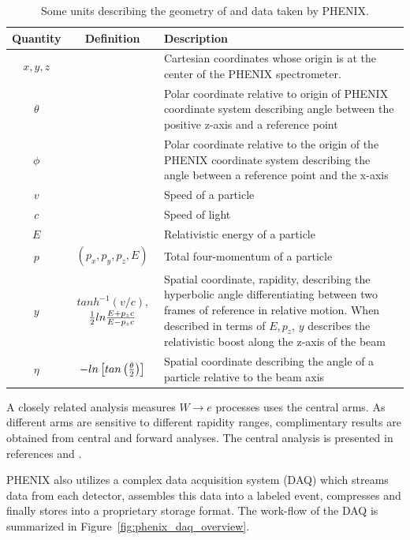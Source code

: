 \begin{table}[ht] 
  \centering
  \begin{tabular}{ c c p{8cm} }
    \toprule
    \textbf{Quantity} & \textbf{Definition} &  \textbf{Description} \\
    \midrule
    $x,y,z$ & & Cartesian coordinates whose origin is at the center of the PHENIX spectrometer. \\
    $\theta$ & & Polar coordinate relative to origin of PHENIX coordinate system describing angle between the positive z-axis and a reference point \\ 
    $\phi$ & & Polar coordinate relative to the origin of the PHENIX coordinate system describing the angle between a reference point and the x-axis \\
    $v$ & & Speed of a particle \\
    $c$ & & Speed of light \\
    $E$ & & Relativistic energy of a particle \\
    $p$ & $\left(p_x,p_y,p_z,E\right)$ & Total four-momentum of a particle \\
    $y$ & $tanh^{-1}(v/c)$, ${1\over2}{ln{{E+p_zc}\over{E-p_zc}}}$ & Spatial coordinate, rapidity, describing the hyperbolic angle differentiating between two frames of reference in relative motion. When described in terms of $E,p_z$, $y$ describes the relativistic boost along the z-axis of the beam\\ 
    $\eta$ & $-ln\left[tan\left({\theta\over2}\right)\right]$ & Spatial coordinate describing the angle of a particle relative to the beam axis \\
    \bottomrule
  \end{tabular}
  \caption{
    Some units describing the geometry of and data taken by PHENIX.
  }
  \label{tab:units}
\end{table}

A closely related analysis measures $W\rightarrow e$ processes uses the central
arms. As different arms are sensitive to different rapidity ranges,
complimentary results are obtained from central and forward analyses. The
central analysis is presented in references \cite{Gal2014b} and
\cite{Adare2015a}. 

PHENIX also utilizes a complex data acquisition system (DAQ) which streams data
from each detector, assembles this data into a labeled event, compresses and
finally stores into a proprietary storage format. The work-flow of the DAQ is
summarized in Figure~\ref{fig:phenix_daq_overview}. 

